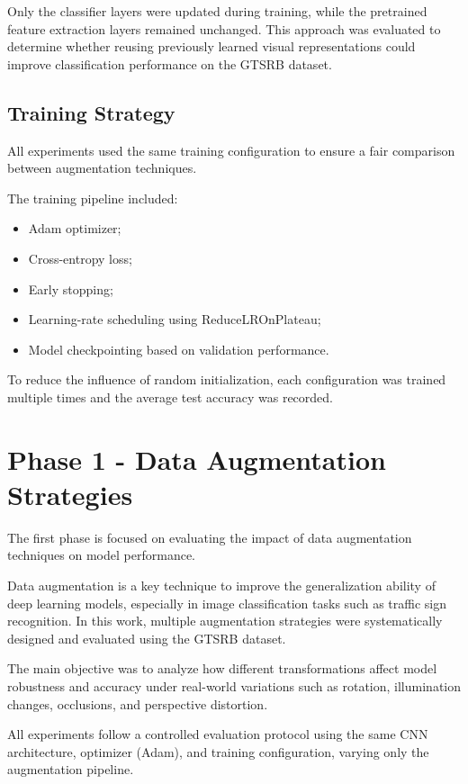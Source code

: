 \documentclass[conference,a4paper]{IEEEtran}
\begin{document}
Only the classifier layers were updated during training, while the pretrained feature extraction layers remained unchanged. This approach was evaluated to determine whether reusing previously learned visual representations could improve classification performance on the GTSRB dataset.

\subsection{Training Strategy}

All experiments used the same training configuration to ensure a fair comparison between augmentation techniques.

The training pipeline included:

\begin{itemize}
\item Adam optimizer;
\item Cross-entropy loss;
\item Early stopping;
\item Learning-rate scheduling using ReduceLROnPlateau;
\item Model checkpointing based on validation performance.
\end{itemize}

To reduce the influence of random initialization, each configuration was trained multiple times and the average test accuracy was recorded.

\section{Phase 1 - Data Augmentation Strategies}
The first phase is focused on evaluating the impact of data augmentation techniques on model performance.

Data augmentation is a key technique to improve the generalization ability of deep learning models, especially in image classification tasks such as traffic sign recognition. In this work, multiple augmentation strategies were systematically designed and evaluated using the GTSRB dataset.

The main objective was to analyze how different transformations affect model robustness and accuracy under real-world variations such as rotation, illumination changes, occlusions, and perspective distortion.

All experiments follow a controlled evaluation protocol using the same CNN architecture, optimizer (Adam), and training configuration, varying only the augmentation pipeline.
\end{document}
